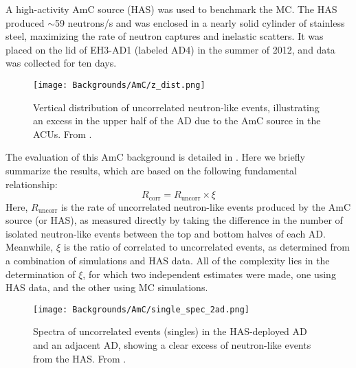 \documentclass[../thesis.tex]{subfiles}
\begin{document}
A high-activity AmC source (HAS) was used to benchmark the MC. The HAS produced $\sim$59 neutrons/s and was enclosed in a nearly solid cylinder of stainless steel, maximizing the rate of neutron captures and inelastic scatters. It was placed on the lid of EH3-AD1 (labeled AD4) in the summer of 2012, and data was collected for ten days.

\begin{figure}[ht]
  \texttt{[image: Backgrounds/AmC/z\_dist.png]}
  \caption{Vertical distribution of uncorrelated neutron-like events, illustrating an excess in the upper half of the AD due to the AmC source in the ACUs. From \cite{Gu_2016}.}
  \label{fig:amc_z_dist}
\end{figure}

The evaluation of this AmC background is detailed in \cite{Gu_2016}. Here we briefly summarize the results, which are based on the following fundamental relationship:
\begin{equation}
  \label{eq:bkgAmcFundamental}
  R_{\mathrm{corr}} = R_{\mathrm{uncorr}} \times \xi
\end{equation}
Here, $R_{\mathrm{uncorr}}$ is the rate of uncorrelated neutron-like events produced by the AmC source (or HAS), as measured directly by taking the difference in the number of isolated neutron-like events between the top and bottom halves of each AD. Meanwhile, $\xi$ is the ratio of correlated to uncorrelated events, as determined from a combination of simulations and HAS data. All of the complexity lies in the determination of $\xi$, for which two independent estimates were made, one using HAS data, and the other using MC simulations.

\begin{figure}[ht]
  \texttt{[image: Backgrounds/AmC/single\_spec\_2ad.png]}
  \caption{Spectra of uncorrelated events (singles) in the HAS-deployed AD and an adjacent AD, showing a clear excess of neutron-like events from the HAS. From \cite{Gu_2016}.}
  \label{fig:amc_single_spec_2ad}
\end{figure}
\end{document}

